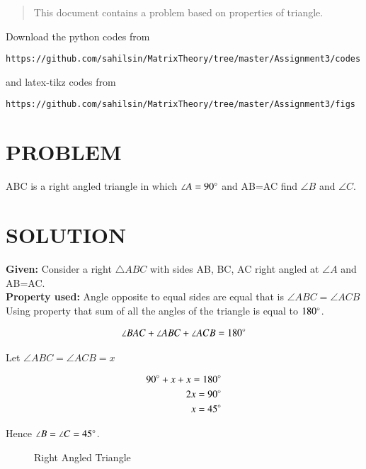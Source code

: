 \begin{abstract}
This document contains a problem based on properties of triangle.
\end{abstract}

Download the python codes from 
%
\begin{lstlisting}
https://github.com/sahilsin/MatrixTheory/tree/master/Assignment3/codes
\end{lstlisting}
%
and latex-tikz codes from 
%
\begin{lstlisting}
https://github.com/sahilsin/MatrixTheory/tree/master/Assignment3/figs
\end{lstlisting}
%
\section{PROBLEM}
ABC is a right angled triangle in which $\angle A=90\degree$ and AB=AC find $\angle B$ and $\angle C$. 

\section{SOLUTION}
\textbf{Given:} Consider a right $\triangle{ABC}$ with sides AB, BC, AC right angled at $\angle A$ and AB=AC.\\

\textbf{Property used:} Angle opposite to equal sides are equal that is $\angle ABC = \angle ACB $\\

Using property that sum of all the angles of the triangle is equal to $180 \degree$.

\begin{align}
    \angle BAC + \angle ABC + \angle ACB = 180\degree
\end{align}

Let $\angle ABC = \angle ACB = x $

\begin{align}
    90\degree + x + x = 180 \degree
\\
    2x = 90\degree
\\
    x=45\degree
\end{align}

Hence $\angle B = \angle C = 45\degree$.

\begin{figure}[h!]
\begin{center}
	\resizebox{\columnwidth/1}{!}{}
\end{center}
\caption{Right Angled Triangle}
\label{fig:Triangle}
\end{figure}

